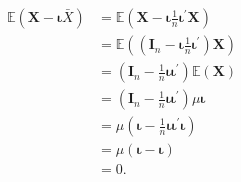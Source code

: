 \documentclass{tstextbook}
\begin{document}
\begin{example}
	\label{example1.3}
\[
\begin{aligned}
\mathbb{E}(\textbf{X}-\boldsymbol{\iota}\bar{X}) & =\mathbb{E}\left(\textbf{X}-\boldsymbol{\iota}\frac{1}{n}\boldsymbol{\iota}^{\prime}\textbf{X}\right) \\
 & =\mathbb{E}\left(\left(\boldsymbol{I}_{n}-\boldsymbol{\iota}\frac{1}{n}\boldsymbol{\iota}^{\prime}\right)\textbf{X}\right) \\
 & =\left(\boldsymbol{I}_{n}-\frac{1}{n}\boldsymbol{\iota}\boldsymbol{\iota}^{\prime}\right)\mathbb{E}(\textbf{X}) \\
 & =\left(\boldsymbol{I}_{n}-\frac{1}{n}\boldsymbol{\iota}\boldsymbol{\iota}^{\prime}\right)\mu\boldsymbol{\iota} \\
 & =\mu\left(\boldsymbol{\iota}-\frac{1}{n}\boldsymbol{\iota}\boldsymbol{\iota}^{\prime}\boldsymbol{\iota}\right) \\
 & =\mu(\boldsymbol{\iota}-\boldsymbol{\iota}) \\
 & =0.
\end{aligned}
\]

\end{example}
\end{document}
